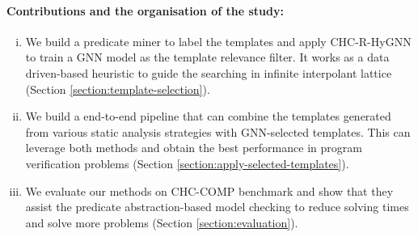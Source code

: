 \paragraph{Contributions and the organisation of the study:}
\begin{enumerate}[(i)]
  \item We build a predicate miner to label the templates and apply CHC-R-HyGNN to train a GNN model as the template relevance filter. It works as a data driven-based heuristic to guide the searching in infinite interpolant lattice (Section \ref{section:template-selection}).
  \item We build a end-to-end pipeline that can combine the templates generated from various static analysis strategies with GNN-selected templates. This can leverage both methods and obtain the best performance in program verification problems (Section \ref{section:apply-selected-templates}). 
  \item We evaluate our methods on CHC-COMP benchmark and show that they assist the predicate abstraction-based model checking to reduce solving times and solve more problems (Section \ref{section:evaluation}).
\end{enumerate}



